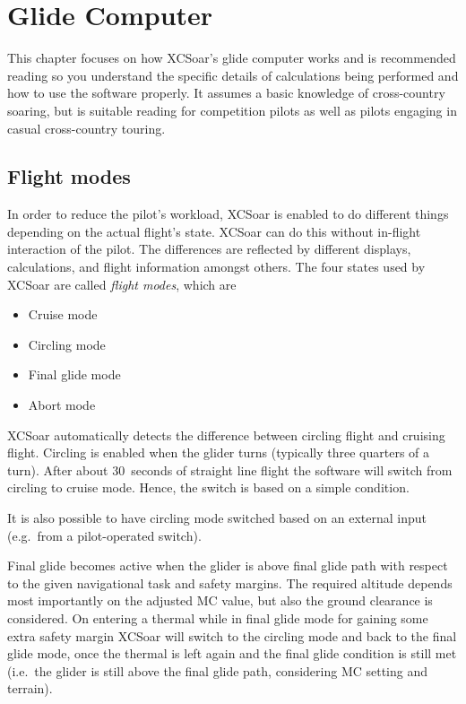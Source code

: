
\chapter{Glide Computer}\label{cha:glide}
This chapter focuses on how XCSoar's glide computer works and is
recommended reading so you understand the specific details of
calculations being performed and how to use the software properly.  It
assumes a basic knowledge of cross-country soaring, but is suitable
reading for competition pilots as well as pilots engaging in casual
cross-country touring.


\section{Flight modes}\label{sec:flightmodes}

In order to reduce the pilot's workload, XCSoar is enabled to do 
different things depending on the actual flight's state. XCSoar can 
do this without in-flight interaction of the pilot. The differences are 
reflected by different displays, calculations, and flight information 
amongst others. The four states used by XCSoar are called 
\emph{flight modes}, which are
\begin{itemize}
\item Cruise mode
\item Circling mode
\item Final glide mode
\item Abort mode
\end{itemize}
XCSoar automatically detects the difference between circling flight and 
cruising flight. Circling is enabled when the glider turns (typically 
three quarters of a turn). After about 30~seconds of straight line flight 
the software will switch from circling to cruise mode. Hence, the switch 
is based on a simple condition.

It is also possible to have circling mode switched based on an external 
input (e.g.\ from a pilot-operated switch).

Final glide becomes active when the glider is above final glide 
path with respect to the given navigational task and safety margins. 
The required altitude depends most 
importantly on the adjusted MC value, but also the ground clearance 
is considered. On entering a thermal while in final glide mode for 
gaining some extra safety margin XCSoar will switch to the circling 
mode and back to the final glide mode, once the thermal is left again 
and the final glide condition is still met (i.e.\ the glider is still
above the final glide path, considering MC setting and terrain).

